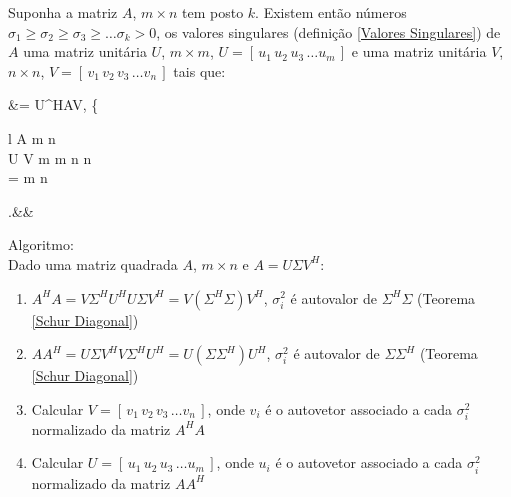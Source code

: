 \documentclass[10pt,a4paper]{article}
\begin{document}
\begin{theorem}
	Suponha a matriz $A$, $m \times n$ tem posto $k$. Existem então números $\sigma_1 \geq \sigma_2 \geq \sigma_3 \geq \dots \sigma_k > 0$, os valores singulares (definição \ref{Valores Singulares}) de $A$ uma matriz unitária $U$, $m \times m$, $U = [ \, u_1 \, u_2 \, u_3 \, \dots u_m \, ]$ e uma matriz unitária $V$, $n \times n$, $V = [ \, v_1 \, v_2 \, v_3 \, \dots v_n \, ]$ tais que:
	\begin{flalign*}
		&\Sigma = U^HAV,  \left\{\begin{array}{l}
			A  m \times n\\
			U  V  m \times m  n \times n \\
			\Sigma =   m \times n
		\end{array}\right.&&
	\end{flalign*}
\end{theorem}

Algoritmo:\\
Dado uma matriz quadrada $A$, $m \times n$ e $A = U\Sigma V^H$:
\begin{enumerate}
	\item $A^H A = V\Sigma^HU^HU\Sigma V^H = V(\Sigma^H\Sigma)V^H$, $\sigma^2_i$ é autovalor de $\Sigma^H\Sigma$ (Teorema \ref{Schur Diagonal})
	\item $AA^H = U\Sigma V^HV\Sigma^H U^H = U(\Sigma\Sigma^H)U^H$, $\sigma^2_i$ é autovalor de $\Sigma\Sigma^H$ (Teorema \ref{Schur Diagonal})
	\item Calcular $V = [ \, v_1 \, v_2 \, v_3 \, \dots v_n \, ]$, onde $v_i$ é o autovetor associado a cada $\sigma^2_i$ normalizado da matriz $A^HA$
	\item Calcular $U = [ \, u_1 \, u_2 \, u_3 \, \dots u_m \, ]$, onde $u_i$ é o autovetor associado a cada $\sigma^2_i$ normalizado da matriz $AA^H$
\end{enumerate}
\end{document}
